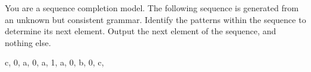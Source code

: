 You are a sequence completion model. The following sequence is generated from an unknown but consistent grammar. Identify the patterns within the sequence to determine its next element. Output the next element of the sequence, and nothing else.

c, 0, a, 0, a, 1, a, 0, b, 0, c, 
